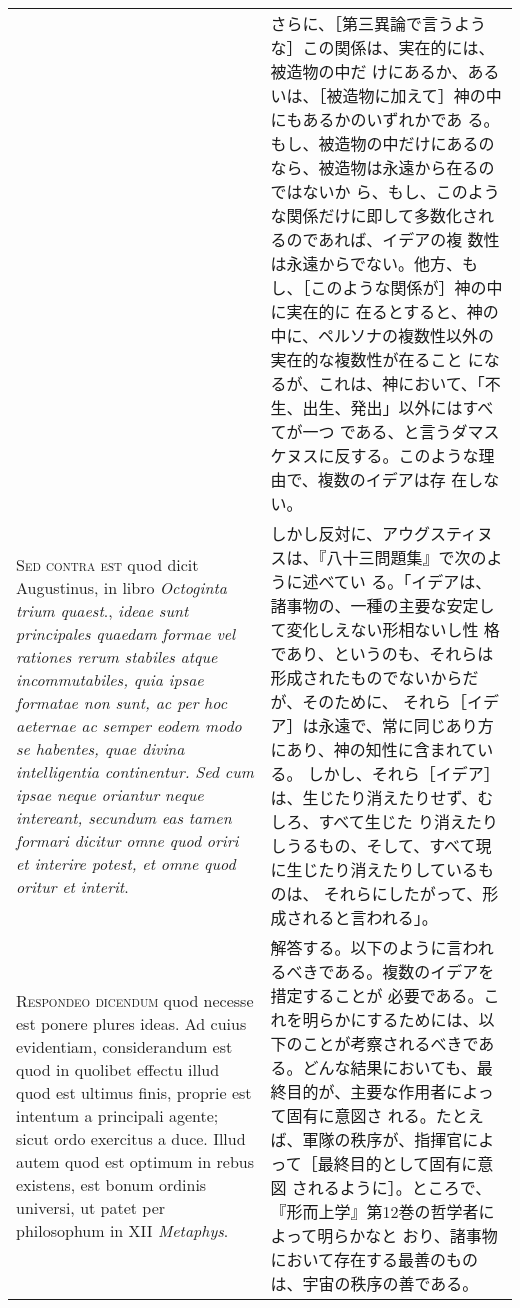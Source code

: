 \documentclass[10pt]{jsarticle} %
\begin{document}
\begin{longtable}{p{21em}p{21em}}
 &

 さらに、［第三異論で言うような］この関係は、実在的には、被造物の中だ
けにあるか、あるいは、［被造物に加えて］神の中にもあるかのいずれかであ
る。もし、被造物の中だけにあるのなら、被造物は永遠から在るのではないか
ら、もし、このような関係だけに即して多数化されるのであれば、イデアの複
数性は永遠からでない。他方、もし、［このような関係が］神の中に実在的に
在るとすると、神の中に、ペルソナの複数性以外の実在的な複数性が在ること
になるが、これは、神において、「不生、出生、発出」以外にはすべてが一つ
である、と言うダマスケヌスに反する。このような理由で、複数のイデアは存
在しない。

\\

{\scshape Sed contra est} quod dicit Augustinus, in libro {\itshape
Octoginta trium quaest}., {\itshape ideae sunt principales quaedam
formae vel rationes rerum stabiles atque incommutabiles, quia ipsae
formatae non sunt, ac per hoc aeternae ac semper eodem modo se habentes,
quae divina intelligentia continentur. Sed cum ipsae neque oriantur
neque intereant, secundum eas tamen formari dicitur omne quod oriri et
interire potest, et omne quod oritur et interit}.

&

しかし反対に、アウグスティヌスは、『八十三問題集』で次のように述べてい
る。「イデアは、諸事物の、一種の主要な安定して変化しえない形相ないし性
格であり、というのも、それらは形成されたものでないからだが、そのために、
それら［イデア］は永遠で、常に同じあり方にあり、神の知性に含まれている。
しかし、それら［イデア］は、生じたり消えたりせず、むしろ、すべて生じた
り消えたりしうるもの、そして、すべて現に生じたり消えたりしているものは、
それらにしたがって、形成されると言われる」。


\\


{\scshape Respondeo dicendum} quod necesse est ponere plures ideas. Ad
cuius evidentiam, considerandum est quod in quolibet effectu illud
quod est ultimus finis, proprie est intentum a principali agente;
sicut ordo exercitus a duce. Illud autem quod est optimum in rebus
existens, est bonum ordinis universi, ut patet per philosophum in XII
{\itshape Metaphys}.

&

解答する。以下のように言われるべきである。複数のイデアを措定することが
必要である。これを明らかにするためには、以下のことが考察されるべきであ
る。どんな結果においても、最終目的が、主要な作用者によって固有に意図さ
れる。たとえば、軍隊の秩序が、指揮官によって［最終目的として固有に意図
されるように］。ところで、『形而上学』第12巻の哲学者によって明らかなと
おり、諸事物において存在する最善のものは、宇宙の秩序の善である。



\end{longtable}
\end{document}
